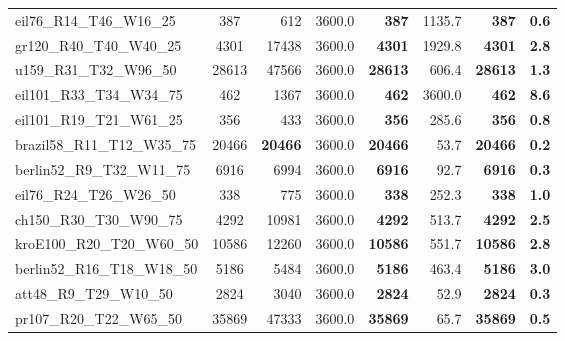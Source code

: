 \documentclass{singlecol-new}
\theoremstyle{TH}{
\newtheorem{lemma}{Lemma}
\newtheorem{theorem}[lemma]{Theorem}
\newtheorem{corrolary}[lemma]{Corrolary}
\newtheorem{conjecture}[lemma]{Conjecture}
\newtheorem{proposition}[lemma]{Proposition}
\newtheorem{claim}[lemma]{Claim}
\newtheorem{stheorem}[lemma]{Wrong Theorem}
}
\theoremstyle{THrm}{
\newtheorem{definition}{Definition}[section]
\newtheorem{question}{Question}[section]
\newtheorem{remark}{Remark}
\newtheorem{scheme}{Scheme}
}
\theoremstyle{THhit}{
\newtheorem{case}{Case}[section]
}
\begin{document}
\begin{table}
{\begin{tabular}{lcrrrrrr}
		eil76\_R14\_T46\_W16\_25    & 387                  & 612             & 3600.0 & \textbf{387}          & 1135.7          & \textbf{387}   & \textbf{0.6}    \\
		gr120\_R40\_T40\_W40\_25    & 4301                 & 17438           & 3600.0 & \textbf{4301}         & 1929.8          & \textbf{4301}  & \textbf{2.8}    \\
		u159\_R31\_T32\_W96\_50     & 28613                & 47566           & 3600.0 & \textbf{28613}        & 606.4           & \textbf{28613} & \textbf{1.3}    \\
		eil101\_R33\_T34\_W34\_75   & 462                  & 1367            & 3600.0 & \textbf{462}          & 3600.0          & \textbf{462}   & \textbf{8.6}    \\
		eil101\_R19\_T21\_W61\_25   & 356                  & 433             & 3600.0 & \textbf{356}          & 285.6           & \textbf{356}   & \textbf{0.8}    \\
		brazil58\_R11\_T12\_W35\_75 & 20466                & \textbf{20466}  & 3600.0 & \textbf{20466}        & 53.7            & \textbf{20466} & \textbf{0.2}    \\
		berlin52\_R9\_T32\_W11\_75  & 6916                 & 6994            & 3600.0 & \textbf{6916}         & 92.7            & \textbf{6916}  & \textbf{0.3}    \\
		eil76\_R24\_T26\_W26\_50    & 338                  & 775             & 3600.0 & \textbf{338}          & 252.3           & \textbf{338}   & \textbf{1.0}    \\
		ch150\_R30\_T30\_W90\_75    & 4292                 & 10981           & 3600.0 & \textbf{4292}         & 513.7           & \textbf{4292}  & \textbf{2.5}    \\
		kroE100\_R20\_T20\_W60\_50  & 10586                & 12260           & 3600.0 & \textbf{10586}        & 551.7           & \textbf{10586} & \textbf{2.8}    \\
		berlin52\_R16\_T18\_W18\_50 & 5186                 & 5484            & 3600.0 & \textbf{5186}         & 463.4           & \textbf{5186}  & \textbf{3.0}    \\
		att48\_R9\_T29\_W10\_50     & 2824                 & 3040            & 3600.0 & \textbf{2824}         & 52.9            & \textbf{2824}  & \textbf{0.3}    \\
		pr107\_R20\_T22\_W65\_50    & 35869                & 47333           & 3600.0 & \textbf{35869}        & 65.7            & \textbf{35869} & \textbf{0.5}    \\

\end{tabular}}
\end{table}
\end{document}
